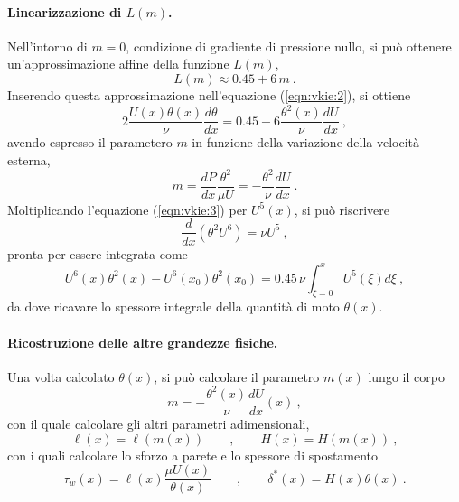 \paragraph{Linearizzazione di $L(m)$.} Nell'intorno di $m=0$, condizione di gradiente di pressione nullo, si può ottenere un'approssimazione affine della funzione $L(m)$,
\begin{equation}
 L(m) \approx 0.45 + 6 \, m \ .
\end{equation}
Inserendo questa approssimazione nell'equazione (\ref{eqn:vkie:2}), si ottiene
\begin{equation}\label{eqn:vkie:3}
 2 \dfrac{U(x) \theta(x)}{\nu} \dfrac{d \theta}{dx} = 0.45 - 6 \dfrac{\theta^2(x)}{\nu} \dfrac{dU}{dx} \ ,
\end{equation}
avendo espresso il parametero $m$ in funzione della variazione della velocità esterna,
\begin{equation}
 m = \dfrac{dP}{dx} \dfrac{\theta^2}{\mu U} = - \dfrac{\theta^2}{\nu} \dfrac{dU}{dx} \ .
\end{equation}
Moltiplicando l'equazione (\ref{eqn:vkie:3}) per $U^5(x)$, si può riscrivere
\begin{equation}
 \dfrac{d}{dx} \left( \theta^2 U^6 \right) = \nu U^5 \ ,
\end{equation}
pronta per essere integrata come
\begin{equation}
 U^6(x) \theta^2(x) - U^6(x_0) \theta^2(x_0) = 0.45 \, \nu \int_{\xi=0}^{x} U^5(\xi) d \xi \ ,
\end{equation}
da dove ricavare lo spessore integrale della quantità di moto $\theta(x)$.

\paragraph{Ricostruzione delle altre grandezze fisiche.}
Una volta calcolato $\theta(x)$, si può calcolare il parametro $m(x)$ lungo il corpo
\begin{equation}
  m = - \dfrac{\theta^2(x)}{\nu}\dfrac{dU}{dx}(x) \ ,
\end{equation}
con il quale calcolare gli altri parametri adimensionali,
\begin{equation}
 \ell(x) = \ell(m(x)) \qquad , \qquad H(x) = H(m(x)) \ ,
\end{equation}
con i quali calcolare lo sforzo a parete e lo spessore di spostamento
\begin{equation}
 \tau_w(x) = \ell(x) \dfrac{\mu U(x)}{\theta(x)} \qquad , \qquad \delta^*(x) = H(x) \theta(x) \ .
\end{equation}

